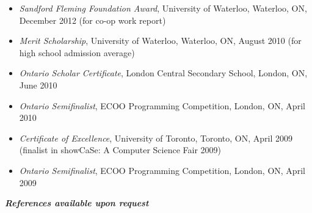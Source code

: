 \documentclass[10pt,letterpaper]{article}
\begin{document}
\begin{adjustwidth}{0.1in}{0.5in}
    \begin{itemize}
	\item \emph{Sandford Fleming Foundation Award}, University of Waterloo, Waterloo, ON, December 2012
	    (for co-op work report)
	\item \emph{Merit Scholarship}, University of Waterloo, Waterloo, ON, August 2010
	    (for high school admission average)
	\item \emph{Ontario Scholar Certificate}, London Central Secondary School, London, ON, June 2010
	\item \emph{Ontario Semifinalist}, ECOO Programming Competition, London, ON, April 2010
	\item \emph{Certificate of Excellence}, University of Toronto, Toronto, ON, April 2009
	    (finalist in showCaSe: A Computer Science Fair 2009)
	\item \emph{Ontario Semifinalist}, ECOO Programming Competition, London, ON, April 2009
    \end{itemize}
\end{adjustwidth}
\vspace{1em}
\begin{center}
	\textbf{\textit{References available upon request}}
\end{center}
\end{document}
